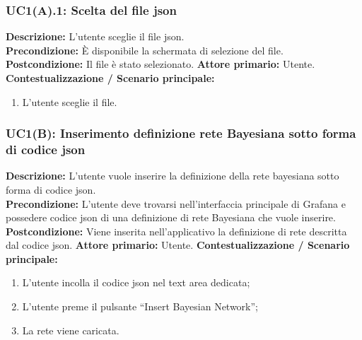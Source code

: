                     \clearpage    
                    
                \subsubsection{UC1(A).1: Scelta del file json }
                     \textbf{Descrizione:} L’utente sceglie il file json.\\
                    \textbf{Precondizione:} È disponibile la schermata di selezione del file.   
                    \newline
                    \textbf{Postcondizione:} Il file è stato selezionato. 
                    \newline
                    \textbf{Attore primario:} Utente.
                    \newline
                    \textbf{Contestualizzazione / Scenario principale:} \begin{enumerate}
                        \item L’utente sceglie il file.
                    \end{enumerate}
                    
                        
                \subsubsection{UC1(B): Inserimento definizione rete Bayesiana sotto forma di codice json}
                    \textbf{Descrizione:} L’utente vuole inserire la definizione della rete bayesiana sotto forma di codice json.\\
                    \textbf{Precondizione:}  L’utente deve trovarsi nell'interfaccia principale di Grafana e possedere codice json di una definizione di rete Bayesiana che vuole inserire.
                    \newline
                    \textbf{Postcondizione:} Viene inserita nell'applicativo la definizione di rete descritta dal codice json.
                    \newline
                    \textbf{Attore primario:} Utente.
                    \newline
                    \textbf{Contestualizzazione / Scenario principale:} \begin{enumerate}
                        \item L’utente incolla il codice json nel text area dedicata;
                        \item L’utente preme il pulsante “Insert Bayesian Network”;
                        \item La rete viene caricata.
                    \end{enumerate}
                    
